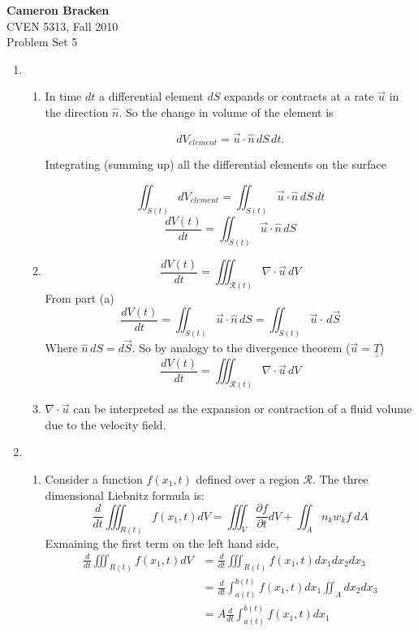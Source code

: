 \documentclass[11pt,twoside]{article}
\newcommand{\p}[2]{\frac{\partial#1}{\partial#2}}
\newcommand{\vect}[1]{\vec{#1}}
\newcommand{\grad}{\nabla}
\newcommand{\tensor}[1]{\underline{\underline{#1}}}
\begin{document}
\thispagestyle{empty}
\noindent\textbf{Cameron Bracken}\\
CVEN 5313, Fall 2010\\
Problem Set 5


\begin{enumerate}

%
%
\item 
\begin{enumerate}

\item In time $dt$ a differential element $dS$ expands or contracts at a rate $\vect{u}$ in the direction $\hat{n}$. So the change in volume of the element is

$$dV_{element}=\vect{u}\cdot\hat{n}\,dS\,dt.$$

Integrating (summing up) all the differential elements on the surface 

$$\iint_{S(t)}dV_{element}=\iint_{S(t)}\vect{u}\cdot\hat{n}\,dS\,dt$$
$$\frac{dV(t)}{dt}=\iint_{S(t)}\vect{u}\cdot\hat{n}\,dS$$

\item 
$$\frac{dV(t)}{dt} = \iiint_{\mathcal{R}(t)}\grad\cdot\vect{u}\,dV$$
From part (a)
$$\frac{dV(t)}{dt} = \iint_{S(t)}\vect{u}\cdot\hat{n}\,dS = \iint_{S(t)}\vect{u}\cdot\,d\vect{S}$$
Where $\hat{n}\,dS=d\vect{S}$. So by analogy to the divergence theorem ($\vect{u}=\tensor{T}$)
$$\frac{dV(t)}{dt} = \iiint_{\mathcal{R}(t)}\grad\cdot\vect{u}\,dV$$

\item $\grad\cdot\vect{u}$ can be interpreted as the expansion or contraction of a fluid volume due to the velocity field. 
\end{enumerate}

%
%
\item 
\begin{enumerate}
\item[]

Consider a function $f(x_1,t)$ defined over a region $\mathcal{R}$.  The three dimensional Liebnitz formula is: 
\begin{equation}
\frac{d}{dt}\iiint_{R(t)}f(x_1,t)dV = \iiint_V \p{f}{t} dV + \iint_A n_k w_k f\: dA\label{lieb}
\end{equation}
Exmaining the first term on the left hand side, 
\begin{align}
\frac{d}{dt}\iiint_{R(t)}f(x_1,t)dV &= \frac{d}{dt}\iiint_{R(t)}f(x_1,t)dx_1dx_2dx_3\nonumber\\
                                    &= \frac{d}{dt}\int_{a(t)}^{b(t)}f(x_1,t)dx_1\iint_Adx_2dx_3\nonumber\\
                                    &= A\frac{d}{dt}\int_{a(t)}^{b(t)}f(x_1,t)dx_1\label{lhs}
\end{align}


\end{enumerate}
\end{enumerate}
\end{document}
